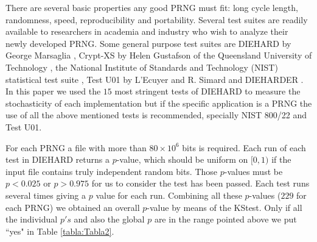 There are several basic properties any good PRNG must fit: long
cycle length, randomness, speed, reproducibility and portability.
Several test suites \cite{Soto} are readily available to
researchers in academia and industry who wish to analyze their
newly developed PRNG. Some general purpose test suites are DIEHARD
by George Marsaglia \cite{Marsaglia1995}, Crypt-XS by Helen
Gustafson of the Queensland University of Technology
\cite{Gustafson1994}, the National Institute of Standards and
Technology (NIST) statistical test suite \cite{Rukhin2000}, Test
U01 by L'Ecuyer and R. Simard \cite{Lecuyer2007}  and DIEHARDER
\cite{Brown2012}. In this paper we used the $15$ most stringent
tests of DIEHARD \cite{Marsaglia1995} to measure the stochasticity
of each implementation but if the specific application is a PRNG
the use of all the above mentioned tests is recommended, specially
NIST 800/22 and Test U01.

For each PRNG a file with more than $80 \times 10^6$ bits is
required. Each run of each test in DIEHARD returns a $p$-value,
which should be uniform on $[0,1)$ if the input file contains
truly independent random bits.   Those $p$-values must be $p <
0.025$ or $p> 0.975$ for us to consider the test has been passed.
Each test runs several times giving a $p$ value for each run.
Combining all these $p$-values ($229$ for each PRNG) we obtained
an overall $p$-value  by means of the KStest. Only if all the
individual $p's$ and also the global $p$ are in the range pointed
above we put ``yes" in Table \ref{tabla:Tabla2}.


